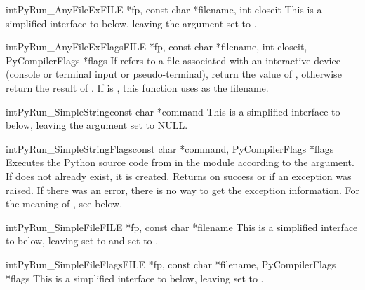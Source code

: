 \begin{cfuncdesc}{int}{PyRun_AnyFileEx}{FILE *fp, const char *filename,
                                        int closeit}
  This is a simplified interface to 
  below, leaving the  argument set to \NULL.
\end{cfuncdesc}

\begin{cfuncdesc}{int}{PyRun_AnyFileExFlags}{FILE *fp, const char *filename,
                                             int closeit,
                                             PyCompilerFlags *flags}
  If  refers to a file associated with an interactive device
  (console or terminal input or \UNIX{} pseudo-terminal), return the
  value of , otherwise return the
  result of .  If  is
  \NULL, this function uses  as the filename.
\end{cfuncdesc}

\begin{cfuncdesc}{int}{PyRun_SimpleString}{const char *command}
  This is a simplified interface to 
  below, leaving the  argument set to NULL.
\end{cfuncdesc}

\begin{cfuncdesc}{int}{PyRun_SimpleStringFlags}{const char *command,
                                                PyCompilerFlags *flags}
  Executes the Python source code from  in the
   module according to the  argument.
  If  does not already exist, it is created.  Returns
   on success or  if an exception was raised.  If there
  was an error, there is no way to get the exception information.
  For the meaning of , see below.
\end{cfuncdesc}

\begin{cfuncdesc}{int}{PyRun_SimpleFile}{FILE *fp, const char *filename}
  This is a simplified interface to 
  below, leaving  set to  and  set to
  \NULL.
\end{cfuncdesc}

\begin{cfuncdesc}{int}{PyRun_SimpleFileFlags}{FILE *fp, const char *filename,
                                              PyCompilerFlags *flags}
  This is a simplified interface to 
  below, leaving  set to .
\end{cfuncdesc}

